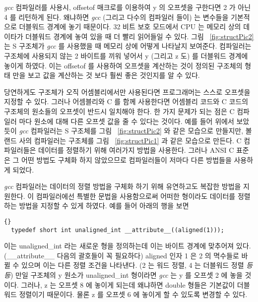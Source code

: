 \emph{gcc} 컴파일러를 사용시, {\code offsetof} 매크로를 이용하여
{\code y} 의 오프셋을 구한다면 2 가 아닌 4 를 리턴하게 된다. 왜냐하면 
 \emph{gcc} (그리고 다수의 컴파일러 들이) 는 변수들을
기본적으로 더블워드 경계에 놓기 때문이다. 32 비트 보호 모드에서 CPU 는 메모리 상의 데이타가 
더블워드 경계에 놓여 있을 때 더 빨리 읽어들일 수 있다. 그림 ~\ref{fig:structPic2} 는 {\code S} 구조체가
\emph{gcc} 를 사용했을 때 메모리 상에 어떻게 나타날지 보여준다. 컴파일러는 
구조체에 사용되지 않는 2 바이트를 끼워 넣어서 {\code y} (그리고 {\code z} 도) 를 더블워드
경계에 놓이게 하였다. 이는 {\code offsetof} 를 사용하여 오프셋을 계산하는 것이 
정의된 구조체의 형태 만을 보고 값을 계산하는 것 보다 훨씬 좋은 것인지를 알 수 있다. 

당연하게도 구조체가 오직 어셈블리에서만 사용된다면 프로그래머는 스스로 오프셋을
지정할 수 있다. 그러나 어셈블리와 C 를 함께 사용한다면 어셈블리 코드와 C 코드의 구조체의 원소들의
오프셋이 반드시 일치해야 한다. 한 가지 문제가 되는 점은 C 컴파일러 마다 원소에 대해 다른 오프셋 값을
줄 수 있다는 것이다. 예를 들어 위에서 보았듯이 \emph{gcc} 컴파일러는 {\code S} 구조체를 그림
~\ref{fig:structPic2} 와 같은 모습으로 만들지만, 볼랜드 사의 컴파일러는 구조체를 그림 ~\ref{fig:structPic1} 과
같은 모습으로 만든다. C 컴파일러들은 데이터를 정렬하기 위해 여러가지 방법을 사용한다. 그러나
ANSI C 표준은 그 어떤 방법도 구체화 하지 않았으므로 컴파일러들이 저마다 다른 방법들을 
사용하게 되었다. 


\emph{gcc}  컴파일러는 데이터의 정렬 방법을 구체화 하기 위해
유연하고도 복잡한 방법을 지원한다. 이 컴파일러에선 특별한 문법을 사용함으로써 어떠한 형이라도 데이터를
정렬하는 방법을 지정할 수 있게 하였다. 예를 들어 아래의 행을 보면 

\begin{lstlisting}[stepnumber=0]{}
  typedef short int unaligned_int __attribute__((aligned(1)));
\end{lstlisting}
\noindent 이는 {\code unaligned\_int} 라는 새로운 형을 정의하는데
이는 바이트 경계에 맞추어져 있다. ({\code \_\_attribute\_\_} 다음의 괄호들이 꼭 필요하다)
{\code aligned} 인자 1 은 2 의 멱수들로 바뀔 수 있으며 이는 다른 정렬 조건을 나타낸다. 
(2 는 워드 정렬, 4 는 더블워드 정렬 \emph{등등}) 만일 구조체의 {\code y} 원소가 
{\code unaligned\_int} 형이라면 \emph{gcc} 는 {\code y} 를 오프셋 2 에 놓을 것이다. 그러나,
{\code z} 는 오프셋 8 에 놓이게 되는데 왜냐하면 double 형들은 기본값이 더블워드 정렬이기 때문이다.
물론 {\code z} 를 오프셋 6 에 놓이게 할 수 있도록 변경할 수 있다. 

